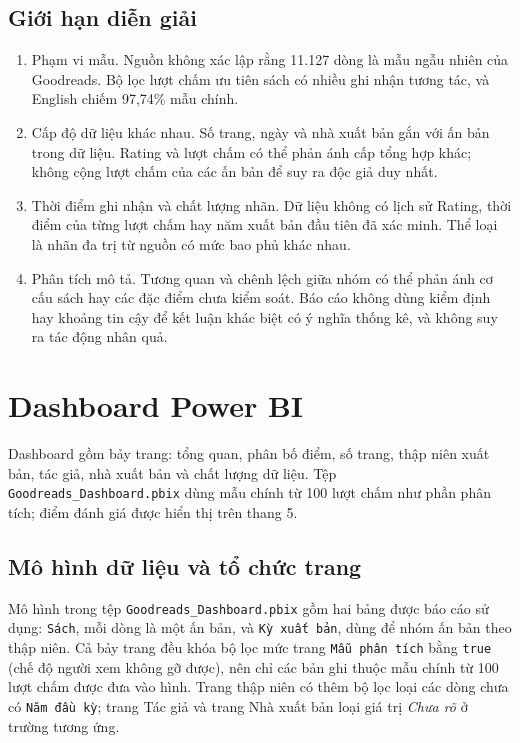 \documentclass[11pt,a4paper]{article}
\begin{document}
\subsection{Giới hạn diễn giải}
\begin{enumerate}
  \item Phạm vi mẫu. Nguồn không xác lập rằng 11.127 dòng là mẫu ngẫu nhiên của Goodreads. Bộ lọc lượt chấm ưu tiên sách có nhiều ghi nhận tương tác, và English chiếm 97,74\% mẫu chính.
  \item Cấp độ dữ liệu khác nhau. Số trang, ngày và nhà xuất bản gắn với ấn bản trong dữ liệu. Rating và lượt chấm có thể phản ánh cấp tổng hợp khác; không cộng lượt chấm của các ấn bản để suy ra độc giả duy nhất.
  \item Thời điểm ghi nhận và chất lượng nhãn. Dữ liệu không có lịch sử Rating, thời điểm của từng lượt chấm hay năm xuất bản đầu tiên đã xác minh. Thể loại là nhãn đa trị từ nguồn có mức bao phủ khác nhau.
  \item Phân tích mô tả. Tương quan và chênh lệch giữa nhóm có thể phản ánh cơ cấu sách hay các đặc điểm chưa kiểm soát. Báo cáo không dùng kiểm định hay khoảng tin cậy để kết luận khác biệt có ý nghĩa thống kê, và không suy ra tác động nhân quả.
\end{enumerate}

\clearpage
\section{Dashboard Power BI}
Dashboard gồm bảy trang: tổng quan, phân bố điểm, số trang, thập niên xuất bản, tác giả, nhà xuất bản và chất lượng dữ liệu. Tệp \texttt{Goodreads\_Dashboard.pbix} dùng mẫu chính từ 100 lượt chấm như phần phân tích; điểm đánh giá được hiển thị trên thang 5.

\subsection{Mô hình dữ liệu và tổ chức trang}
Mô hình trong tệp \texttt{Goodreads\_Dashboard.pbix} gồm hai bảng được báo cáo sử dụng: \texttt{Sách}, mỗi dòng là một ấn bản, và \texttt{Kỳ xuất bản}, dùng để nhóm ấn bản theo thập niên. Cả bảy trang đều khóa bộ lọc mức trang \texttt{Mẫu phân tích} bằng \texttt{true} (chế độ người xem không gỡ được), nên chỉ các bản ghi thuộc mẫu chính từ 100 lượt chấm được đưa vào hình. Trang thập niên có thêm bộ lọc loại các dòng chưa có \texttt{Năm đầu kỳ}; trang Tác giả và trang Nhà xuất bản loại giá trị \textit{Chưa rõ} ở trường tương ứng.
\end{document}
